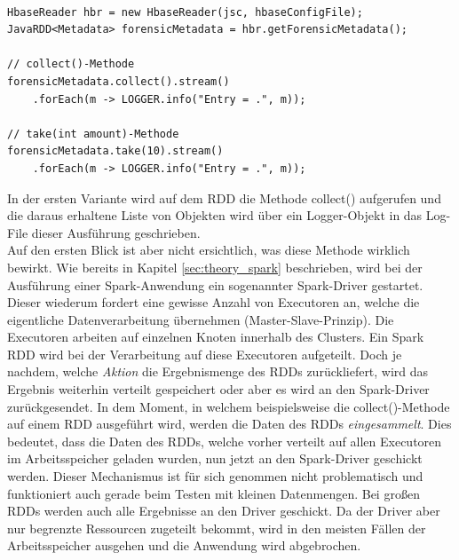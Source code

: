 \begin{lstlisting}[label={lst:spark_rdd_collect},caption= Anzeige der Ergebnisse eines Spark RDDs ,captionpos=b,frame=single,style=customjava]

HbaseReader hbr = new HbaseReader(jsc, hbaseConfigFile);
JavaRDD<Metadata> forensicMetadata = hbr.getForensicMetadata();

// collect()-Methode
forensicMetadata.collect().stream()
	.forEach(m -> LOGGER.info("Entry = .", m));

// take(int amount)-Methode	
forensicMetadata.take(10).stream()
	.forEach(m -> LOGGER.info("Entry = .", m));	
\end{lstlisting}

\noindent
In der ersten Variante wird auf dem RDD die Methode collect() aufgerufen und die daraus erhaltene Liste von Objekten wird über ein Logger-Objekt in das Log-File dieser Ausführung geschrieben.\\
Auf den ersten Blick ist aber nicht ersichtlich, was diese Methode wirklich bewirkt. Wie bereits in Kapitel \ref{sec:theory_spark} beschrieben, wird bei der Ausführung einer Spark-Anwendung ein sogenannter Spark-Driver gestartet. Dieser wiederum fordert eine gewisse Anzahl von Executoren an, welche die eigentliche Datenverarbeitung übernehmen (Master-Slave-Prinzip). Die Executoren arbeiten auf einzelnen Knoten innerhalb des Clusters. Ein Spark RDD wird bei der Verarbeitung auf diese Executoren aufgeteilt. Doch je nachdem, welche \textit{Aktion} die Ergebnismenge des RDDs zurückliefert, wird das Ergebnis weiterhin verteilt gespeichert oder aber es wird an den Spark-Driver zurückgesendet. In dem Moment, in welchem beispielsweise die collect()-Methode auf einem RDD ausgeführt wird, werden die Daten des RDDs \textit{eingesammelt}. Dies bedeutet, dass die Daten des RDDs, welche vorher verteilt auf allen Executoren im Arbeitsspeicher geladen wurden, nun jetzt an den Spark-Driver geschickt werden. Dieser Mechanismus ist für sich genommen nicht problematisch und funktioniert auch gerade beim Testen mit kleinen Datenmengen. Bei großen RDDs werden auch alle Ergebnisse an den Driver geschickt. Da der Driver aber nur begrenzte Ressourcen zugeteilt bekommt, wird in den meisten Fällen der Arbeitsspeicher ausgehen und die Anwendung wird abgebrochen.\\

